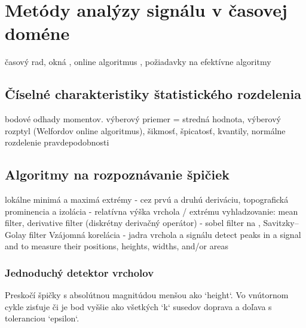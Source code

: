 


\section{Metódy analýzy signálu v časovej doméne}
časový rad, okná
\cite{time-series-analysis} \cite{practical-time-series} \cite{generalized-esd} \cite{twitter-esd}, 
online algoritmus \cite{online-anomaly-detection}, 
požiadavky na efektívne algoritmy
	

\subsection{Číselné charakteristiky štatistického rozdelenia}
bodové odhady momentov. výberový priemer = stredná hodnota, výberový rozptyl (Welfordov online algoritmus), šikmosť, špicatosť, kvantily, normálne rozdelenie pravdepodobnosti


\subsection{Algoritmy na rozpoznávanie špičiek}
lokálne minimá a maximá extrémy - cez prvú a druhú deriváciu,
topografická prominencia a izolácia - relatívna výška vrchola / extrému
vyhladzovanie: mean filter, derivative filter (diskrétny derivačný operátor) - sobel filter na , Savitzky–Golay filter
Vzájomná korelácia - jadra vrchola a signálu
detect peaks in a signal and to measure their positions, heights, widths, and/or areas

\cite{spectrometry-peak-detection}
\cite{survey-peaks-valleys}
\cite{peek-mountaineer-method}
\cite{ecg-r-peak-detection}
\cite{ampd-algorithm}

\subsubsection{Jednoduchý detektor vrcholov}
Preskočí špičky s absolútnou magnitúdou menšou ako `height`. Vo vnútornom cykle zisťuje či je bod vyššie ako všetkých `k` susedov doprava a doľava s toleranciou `epsilon`.

